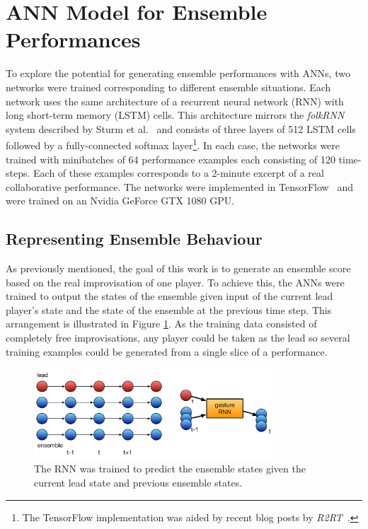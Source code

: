 \documentclass{article}
\begin{document}
\section{ANN Model for Ensemble Performances}

To explore the potential for generating ensemble performances with
ANNs, two networks were trained corresponding to different
ensemble situations. Each network uses the same architecture of a recurrent
neural network (RNN) with long short-term memory (LSTM) cells. This
architecture mirrors the \emph{folkRNN} system described by Sturm et
al.~\cite{Sturm:2016rz} and consists of three layers of 512 LSTM cells
followed by a fully-connected softmax layer\footnote{The TensorFlow
  implementation was aided by recent blog posts by
  \emph{R2RT}~\cite{R2RT-RNN:2016}.}. In each case, the networks were
trained with minibatches of 64 performance examples each consisting of
120 time-steps. Each of these examples corresponds to a 2-minute
excerpt of a real collaborative performance. The networks were
implemented in TensorFlow~\cite{Abadi:2016wd} and were trained on an
Nvidia GeForce GTX 1080 GPU.

\subsection{Representing Ensemble Behaviour}

As previously mentioned, the goal of this work is to generate an
ensemble score based on the real improvisation of one player. To
achieve this, the ANNs were trained to output the states of the
ensemble given input of the current lead player's state and the state of the
ensemble at the previous time step. This arrangement is illustrated in
Figure \ref{fig:nn-ensemble-training}. As the training data consisted
of completely free improvisations, any player could be taken as the
lead so several training examples could be generated from a single
slice of a performance.

\begin{figure}
  \centering
  \includegraphics[width=0.8\textwidth]{nn-ensemble-training}
  \caption{The RNN was trained to predict the ensemble states given
    the current lead state and previous ensemble
    states.}\label{fig:nn-ensemble-training}
\end{figure}
\end{document}
